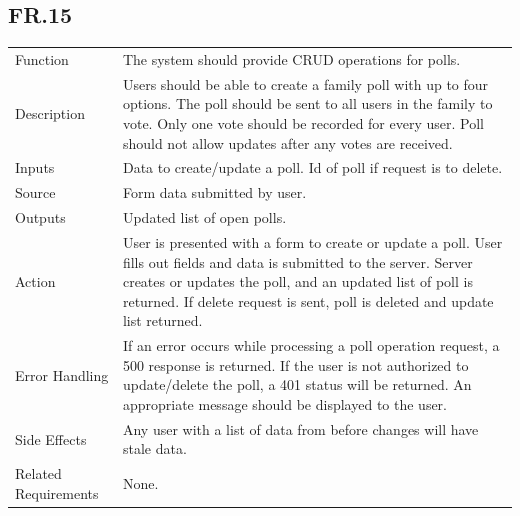 \documentclass[12pt]{article}
\begin{document}
    \subsection*{FR.15}
    \begin{center}
        \begin{tabular}{| p{10em} p{26em} |}
        \hline
         Function & The system should provide CRUD operations for polls.\\
         Description & Users should be able to create a family poll with up to four options. The poll should be sent to all users in the family to vote. Only one vote should be recorded for every user. Poll should not allow updates after any votes are received.\\
         Inputs & Data to create/update a poll. Id of poll if request is to delete.\\
         Source & Form data submitted by user.\\
         Outputs & Updated list of open polls.\\
         Action & User is presented with a form to create or update a poll. User fills out fields and data is submitted to the server. Server creates or updates the poll, and an updated list of poll is returned. If delete request is sent, poll is deleted and update list returned. \\
         Error Handling & If an error occurs while processing a poll operation request, a 500 response is returned. If the user is not authorized to update/delete the poll, a 401 status will be returned. An appropriate message should be displayed to the user.\\
         Side Effects & Any user with a list of data from before changes will have stale data.\\
         Related Requirements & None.\\
         \hline
        \end{tabular}
    \end{center}
\end{document}
